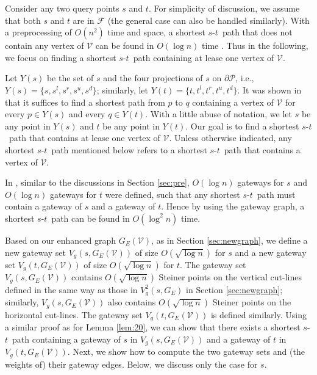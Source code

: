 \documentclass[english,runningheads,11pt]{llncs}
\def\calP{\mathcal{P}}
\def\calF{\mathcal{F}}
\def\calV{\mathcal{V}}
\def\st{$s$-$t$}
\begin{document}
Consider any two query points $s$ and $t$. For simplicity of discussion, we assume that both $s$ and $t$ are
in $\calF$ (the general case can also be handled similarly). With a preprocessing of $O(n^2)$
time and space, a shortest \st\ path that does not
contain any vertex of $\calV$ can be found in $O(\log n)$ time \cite{ref:ChenSh00}. Thus in the
following, we focus on finding a shortest \st\ path containing at lease one
vertex of $\calV$.

Let $Y(s)$ be the set of $s$ and
the four projections of $s$ on $\partial\calP$, i.e., $Y(s)=\{s,s^l,s^r,s^u,s^d\}$;
similarly, let $Y(t)=\{t,t^l,t^r,t^u,t^d\}$. It was shown in
\cite{ref:ChenSh00} that it suffices to find a shortest path
from $p$ to $q$ containing a vertex of $\calV$ for every $p\in Y(s)$ and every $q\in Y(t)$.
With a little abuse of notation,
we let $s$ be any point in $Y(s)$ and $t$ be any point in $Y(t)$. Our
goal is to find a shortest \st\ path that contains at lease one vertex of $\calV$.
Unless otherwise indicated, any shortest \st\ path
mentioned below refers to a shortest \st\ path that contains a vertex of $\calV$.

In \cite{ref:ChenSh00}, similar to the discussions in Section \ref{sec:pre},
$O(\log n)$ gateways for $s$ and $O(\log n)$ gateways for $t$ were defined,
such that any shortest \st\ path must contain a gateway of $s$ and a
gateway of $t$. Hence by using the gateway graph, a shortest \st\ path can be
found in $O(\log^2 n)$ time.


Based on our enhanced graph $G_E(\calV)$, as in Section \ref{sec:newgraph},
we define a new gateway set $V_g(s,G_E(\calV))$ of size $O(\sqrt{\log n})$ for
$s$ and a new gateway set $V_g(t,G_E(\calV))$ of size $O(\sqrt{\log n})$ for $t$.
The gateway set $V_g(s,G_E(\calV))$ contains $O(\sqrt{\log n})$  Steiner points on the
vertical cut-lines defined in the same way as those in $V^2_g(s,G_E)$ in Section \ref{sec:newgraph}; similarly, $V_g(s,G_E(\calV))$ also contains $O(\sqrt{\log n})$  Steiner points on the
horizontal cut-lines.  The gateway set $V_g(t,G_E(\calV))$ is defined similarly.
Using a similar proof as for Lemma \ref{lem:20}, we can show that
there exists a shortest \st\ path containing a gateway of $s$ in $V_g(s,G_E(\calV))$ and a
gateway of $t$ in $V_g(t,G_E(\calV))$. Next, we show how to compute the two gateway sets and
(the weights of) their gateway edges. Below, we discuss only the case for $s$.
\end{document}
